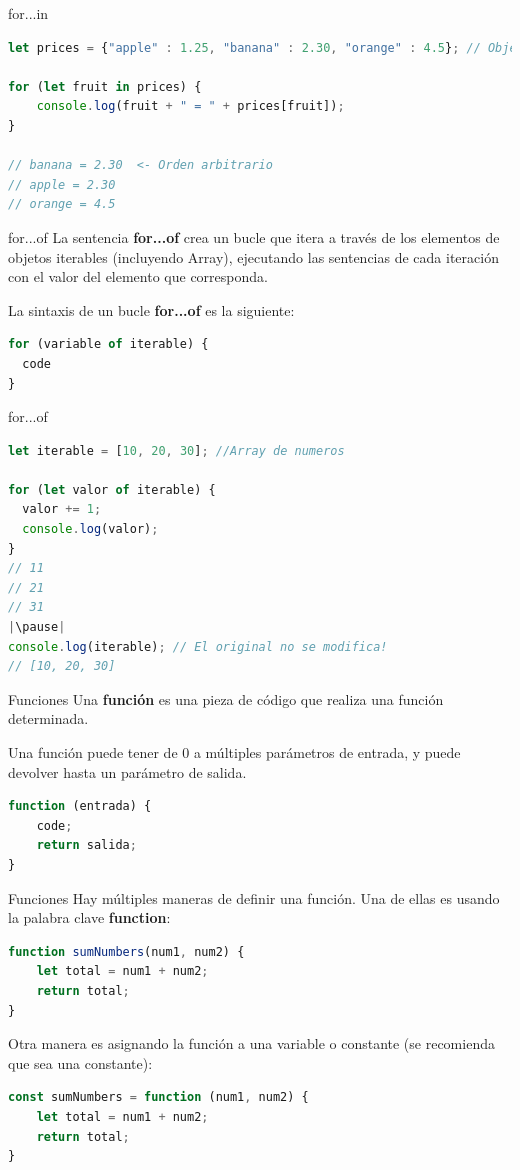 \documentclass{beamer}
\begin{document}
\begin{frame}[fragile]{for...in}
\begin{lstlisting}[language=JavaScript]
let prices = {"apple" : 1.25, "banana" : 2.30, "orange" : 4.5}; // Objeto

for (let fruit in prices) {
    console.log(fruit + " = " + prices[fruit]);
}

// banana = 2.30  <- Orden arbitrario
// apple = 2.30  
// orange = 4.5 


\end{lstlisting}
\end{frame}

\begin{frame}[fragile]{for...of}
La sentencia \textbf{for...of} crea un bucle que itera a través de los elementos de objetos iterables (incluyendo Array), ejecutando las sentencias de cada iteración con el valor del elemento que corresponda.\pause

La sintaxis de un bucle \textbf{for...of} es la siguiente:
\begin{lstlisting}[language=JavaScript]
for (variable of iterable) {
  code
}
\end{lstlisting}
\end{frame}

\begin{frame}[fragile]{for...of}
\begin{lstlisting}[language=JavaScript]
let iterable = [10, 20, 30]; //Array de numeros

for (let valor of iterable) {
  valor += 1;
  console.log(valor);
}
// 11
// 21
// 31
|\pause|
console.log(iterable); // El original no se modifica!
// [10, 20, 30]
\end{lstlisting}
\end{frame}

\begin{frame}[fragile]{Funciones}
Una \textbf{función} es una pieza de código que realiza una función determinada. \pause

Una función puede tener de 0 a múltiples parámetros de entrada, y puede devolver hasta un parámetro de salida.
\begin{lstlisting}[language=JavaScript]
function (entrada) {
    code;
    return salida;
}
\end{lstlisting}
\end{frame}

\begin{frame}[fragile]{Funciones}
Hay múltiples maneras de definir una función. Una de ellas es usando la palabra clave \textbf{function}:
\begin{lstlisting}[language=JavaScript]
function sumNumbers(num1, num2) {
    let total = num1 + num2;
    return total;
}\end{lstlisting} \pause
Otra manera es asignando la función a una variable o constante (se recomienda que sea una constante):
\begin{lstlisting}[language=JavaScript]
const sumNumbers = function (num1, num2) {
    let total = num1 + num2;
    return total;
}
\end{lstlisting}
\end{frame}
\end{document}
